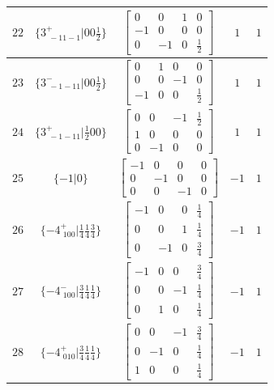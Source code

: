 \documentclass[fleqn,8pt]{jsarticle}
\begin{document}
\begin{longtable}{ccccc}
$ 22 $ & $ \{3^{+}_{\,\,-11-1}|0 0 \frac{1}{2}\} $ & $ \begin{bmatrix} 0 & 0 & 1 & 0 \\ -1 & 0 & 0 & 0 \\ 0 & -1 & 0 & \frac{1}{2} \end{bmatrix} $ & $ 1 $ & $ 1 $ \\ \hline
$ 23 $ & $ \{3^{-}_{\,\,-1-11}|0 0 \frac{1}{2}\} $ & $ \begin{bmatrix} 0 & 1 & 0 & 0 \\ 0 & 0 & -1 & 0 \\ -1 & 0 & 0 & \frac{1}{2} \end{bmatrix} $ & $ 1 $ & $ 1 $ \\ \hline
$ 24 $ & $ \{3^{+}_{\,\,-1-11}|\frac{1}{2} 0 0\} $ & $ \begin{bmatrix} 0 & 0 & -1 & \frac{1}{2} \\ 1 & 0 & 0 & 0 \\ 0 & -1 & 0 & 0 \end{bmatrix} $ & $ 1 $ & $ 1 $ \\ \hline
$ 25 $ & $ \{-1|0\} $ & $ \begin{bmatrix} -1 & 0 & 0 & 0 \\ 0 & -1 & 0 & 0 \\ 0 & 0 & -1 & 0 \end{bmatrix} $ & $ -1 $ & $ 1 $ \\ \hline
$ 26 $ & $ \{-4^{+}_{\,\,100}|\frac{1}{4} \frac{1}{4} \frac{3}{4}\} $ & $ \begin{bmatrix} -1 & 0 & 0 & \frac{1}{4} \\ 0 & 0 & 1 & \frac{1}{4} \\ 0 & -1 & 0 & \frac{3}{4} \end{bmatrix} $ & $ -1 $ & $ 1 $ \\ \hline
$ 27 $ & $ \{-4^{-}_{\,\,100}|\frac{3}{4} \frac{1}{4} \frac{1}{4}\} $ & $ \begin{bmatrix} -1 & 0 & 0 & \frac{3}{4} \\ 0 & 0 & -1 & \frac{1}{4} \\ 0 & 1 & 0 & \frac{1}{4} \end{bmatrix} $ & $ -1 $ & $ 1 $ \\ \hline
$ 28 $ & $ \{-4^{+}_{\,\,010}|\frac{3}{4} \frac{1}{4} \frac{1}{4}\} $ & $ \begin{bmatrix} 0 & 0 & -1 & \frac{3}{4} \\ 0 & -1 & 0 & \frac{1}{4} \\ 1 & 0 & 0 & \frac{1}{4} \end{bmatrix} $ & $ -1 $ & $ 1 $ \\ \hline

\end{longtable}
\end{document}
